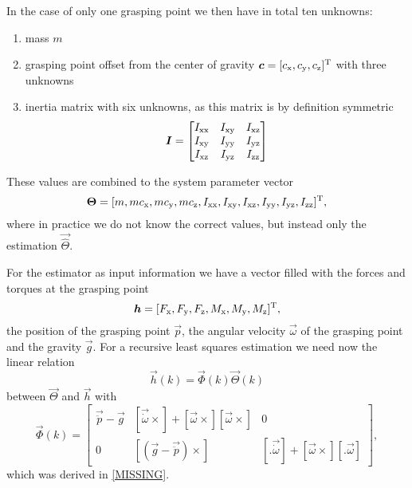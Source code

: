 In the case of only one grasping point we then have in total ten unknowns:
\begin{enumerate}
	\item mass $m$
	\item grasping point offset from the center of gravity $\boldsymbol{c} = [c_{\mathrm{x}}, c_{\mathrm{y}}, c_{\mathrm{z}}]^{\mathrm{T}}$ with three unknowns
	\item inertia matrix with six unknowns, as this matrix is by definition symmetric
	\begin{equation}
		\boldsymbol{I} = 
		\begin{bmatrix}	
			I_{\mathrm{xx}}	& I_{\mathrm{xy}}	& I_{\mathrm{xz}} \\
			I_{\mathrm{xy}}	& I_{\mathrm{yy}}	& I_{\mathrm{yz}} \\
			I_{\mathrm{xz}}	& I_{\mathrm{yz}}	& I_{\mathrm{zz}}
		\end{bmatrix}
	\end{equation}
\end{enumerate}

These values are combined to the system parameter vector
\begin{equation}
	\boldsymbol{\Theta} = [m, m c_{\mathrm{x}}, m c_{\mathrm{y}}, m c_{\mathrm{z}}, I_{\mathrm{xx}}, I_{\mathrm{xy}}, I_{\mathrm{xz}}, I_{\mathrm{yy}},I_{\mathrm{yz}}, I_{\mathrm{zz}}]^{\mathrm{T}},
\end{equation}
where in practice we do not know the correct values, but instead only the estimation $\vec{\hat \Theta}$.

For the estimator as input information we have a vector filled with the forces and torques at the grasping point
\begin{equation}
	\boldsymbol{h} = [F_{\mathrm{x}}, F_{\mathrm{y}}, F_{\mathrm{z}}, M_{\mathrm{x}}, M_{\mathrm{y}}, M_{\mathrm{z}}]^{\mathrm{T}},
\end{equation}
the position of the grasping point $\vec p$, the angular velocity $\vec \omega$ of the grasping point and the gravity $\vec g$. For a recursive least squares estimation we need now the linear relation
\begin{equation}
	\vec{h}(k) = \vec{\Phi}(k) \vec{\Theta}(k)
\end{equation}
between $\vec{\Theta}$ and $\vec{h}$ with
\begin{equation}
	\vec{\Phi}(k) = 
	\begin{bmatrix}
		\vec{\ddot p} - \vec{g}	& [\vec{\dot \omega} \times] + [\vec{\omega}\times] [\vec{\omega} \times]	& 0 \\
		0			& [(\vec{g} - \vec{\ddot p}) \times]									& [.  \vec{\dot \omega}] + [\vec{\omega} \times] [. \vec{\omega}]
	\end{bmatrix},
\end{equation}
which was derived in \ref{MISSING}.

